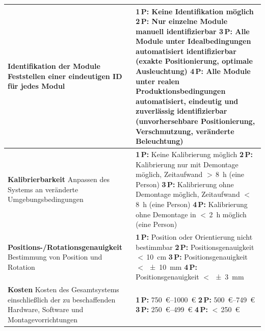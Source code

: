 {\begin{xltabular}{\textwidth}{>{\raggedright\arraybackslash}p{5.4cm}
                              >{\raggedright\arraybackslash}X}
    \textbf{Identifikation der Module}\newline
    Feststellen einer eindeutigen ID für jedes Modul
    & \textbf{1\,P:} Keine Identifikation möglich\newline
      \textbf{2\,P:} Nur einzelne Module manuell identifizierbar\newline
      \textbf{3\,P:} Alle Module unter Idealbedingungen automatisiert identifizierbar (exakte Positionierung, optimale Ausleuchtung)\newline
      \textbf{4\,P:} Alle Module unter realen Produktionsbedingungen automatisiert, eindeutig und zuverlässig identifizierbar (unvorhersehbare Positionierung, Verschmutzung, veränderte Beleuchtung) \\
    \midrule
    \textbf{Kalibrierbarkeit}\newline
    Anpassen des Systems an veränderte Umgebungsbedingungen
    & \textbf{1\,P:} Keine Kalibrierung möglich\newline
      \textbf{2\,P:} Kalibrierung nur mit Demontage möglich, Zeitaufwand $>$\,\SI{8}{\hour} (eine Person)\newline
      \textbf{3\,P:} Kalibrierung ohne Demontage möglich, Zeitaufwand $<$\,\SI{8}{\hour} (eine Person)\newline
      \textbf{4\,P:} Kalibrierung ohne Demontage in $<$\,\SI{2}{\hour} möglich (eine Person) \\
    \midrule
    \textbf{Positions-/Rotationsgenauigkeit}\newline
    Bestimmung von Position und Rotation
    & \textbf{1\,P:} Position oder Orientierung nicht bestimmbar\newline
      \textbf{2\,P:} Positionsgenauigkeit $<$\,\SI{10}{\centi\metre}\newline
      \textbf{3\,P:} Positionsgenauigkeit $<$\,\SI{\pm 10}{\milli\metre}\newline
      \textbf{4\,P:} Positionsgenauigkeit $<$\,\SI{\pm 3}{\milli\metre} \\
    \midrule
    \textbf{Kosten}\newline
    Kosten des Gesamtsystems einschließlich der zu beschaffenden Hardware, Software und Montagevorrichtungen
    & \textbf{1\,P:} \SIrange{750}{1000}{\euro}\newline
      \textbf{2\,P:} \SIrange{500}{749}{\euro}\newline
      \textbf{3\,P:} \SIrange{250}{499}{\euro}\newline
      \textbf{4\,P:} $<$\,\SI{250}{\euro} \\

\end{xltabular}}
